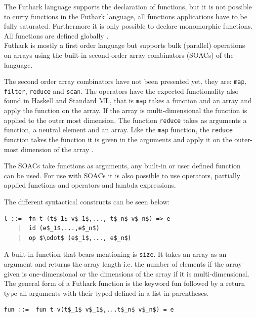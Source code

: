 \documentclass[11pt]{article}
\begin{document}
The Futhark language supports the declaration of functions, but it is not possible to curry functions in the Futhark language,
all functions applications have to be fully saturated. Furthermore it is only possible to declare monomorphic functions.
All functions are defined globally \cite{TroelsHenriksen}. \\

Futhark is mostly a first order language but supports bulk (parallel) operations on arrays
using the built-in second-order array combinators (SOACs) of the language. 

The second order array combinators have not been presented yet, they are:
{\tt map}, {\tt filter}, {\tt reduce} and {\tt scan}.
The operators have the expected functionality also found in Haskell and Standard ML,
that is {\tt map} takes a function and an array and apply the function on the array.
If the array is multi-dimensional the function is applied to the outer most dimension.
The function {\tt reduce} takes as arguments a function, a neutral element and an array.
Like the {\tt map} function, the {\tt reduce} function takes the function it is given in the arguments
and apply it on the outer-most dimension of the array \cite{TroelsHenriksen}. 

The SOACs take functions as arguments, any built-in or user defined function can be used. For use with
SOACs it is also possible to use operators, partially applied functions and operators and lambda expressions.

The different syntactical constructs can be seen below:

\begin{lstlisting}[numbers=none,frame=none]
l ::=  fn t (t$_1$ v$_1$,..., t$_n$ v$_n$) => e
    |  id (e$_1$,...,e$_n$)
    |  op $\odot$ (e$_1$,..., e$_n$)
\end{lstlisting}


A built-in function that bears mentioning is {\tt size}.
It takes an array as an argument and returns the array length i.e.
the number of elements if the array given is one-dimensional or the dimensions of the array if it is multi-dimensional. \\

The general form of a Futhark function is the keyword fun followed by a return type all arguments 
with their typed defined in a list in parentheses.
\begin{lstlisting}[numbers=none,frame=none]
fun ::=  fun t v(t$_1$ v$_1$,...t$_n$ v$_n$) = e
\end{lstlisting}
\end{document}
